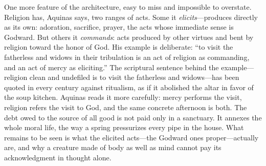 One more feature of the architecture, easy to miss and impossible to overstate. Religion has, Aquinas says, two ranges of acts. Some it \emph{elicits}---produces directly as its own: adoration, sacrifice, prayer, the acts whose immediate sense is Godward. But others it \emph{commands}: acts produced by other virtues and bent by religion toward the honor of God. His example is deliberate: ``to visit the fatherless and widows in their tribulation is an act of religion as commanding, and an act of mercy as eliciting.'' The scriptural sentence behind the example---religion clean and undefiled is to visit the fatherless and widows---has been quoted in every century against ritualism, as if it abolished the altar in favor of the soup kitchen. Aquinas reads it more carefully: mercy performs the visit, religion refers the visit to God, and the same concrete afternoon is both. The debt owed to the source of all good is not paid only in a sanctuary. It annexes the whole moral life, the way a spring pressurizes every pipe in the house. What remains to be seen is what the elicited acts---the Godward ones proper---actually are, and why a creature made of body as well as mind cannot pay its acknowledgment in thought alone.
